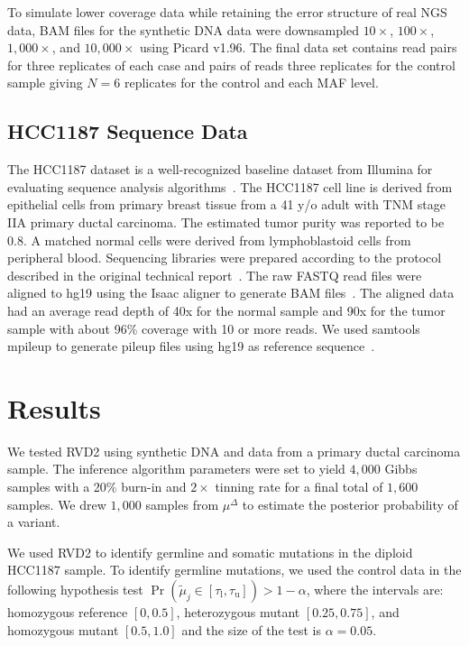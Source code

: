 \documentclass[11pt,reqno]{amsart}
\begin{document}
To simulate lower coverage data while retaining the error structure of real NGS data, BAM files for the synthetic DNA data were downsampled $10\times$, $100\times$, $1,000\times$, and $10,000\times$ using Picard v1.96. The final data set contains read pairs for three replicates of each case and pairs of reads three replicates for the control sample giving $N=6$ replicates for the control and each MAF level.

\subsection{HCC1187 Sequence Data}

The HCC1187 dataset is a well-recognized baseline dataset from Illumina for evaluating sequence analysis algorithms~\citep{newman2013relative,howarth2011large,howarth2007array}. The HCC1187 cell line is derived from  epithelial cells from primary breast tissue from a 41 y/o adult with TNM stage IIA primary ductal carcinoma. The estimated tumor purity was reported to be 0.8. A matched normal cells were derived from lymphoblastoid cells from peripheral blood. Sequencing libraries were prepared according to the protocol described in the original technical report~\citep{hcc1187techreport}. The raw FASTQ read files were aligned to hg19 using the Isaac aligner to generate BAM files~\citep{raczy2013isaac}. The aligned data had an average read depth of 40x for the normal sample and 90x for the tumor sample with about 96\% coverage with 10 or more reads. We used samtools mpileup to generate pileup files using hg19 as reference sequence~\citep{Navin:2010gu}. 


\section{Results}

We tested RVD2 using synthetic DNA and data from a primary ductal carcinoma sample. The inference algorithm parameters were set to yield $4,000$ Gibbs samples with a 20\% burn-in and $2\times$ tinning rate for a final total of $1,600$ samples. We drew $1,000$ samples from $\mu^{\Delta}$ to estimate the posterior probability of a variant.

We used RVD2 to identify germline and somatic mutations in the diploid HCC1187 sample. To identify germline mutations, we used the control data in the following hypothesis test $\Pr( \tilde{\mu}_j \in [\tau_\text{l},\tau_\text{u}] ) > 1-\alpha$, where the intervals are: homozygous reference $[0, 0.5]$, heterozygous mutant $[0.25, 0.75]$, and homozygous mutant $[0.5, 1.0]$ and the size of the test is $\alpha=0.05$.
\end{document}
